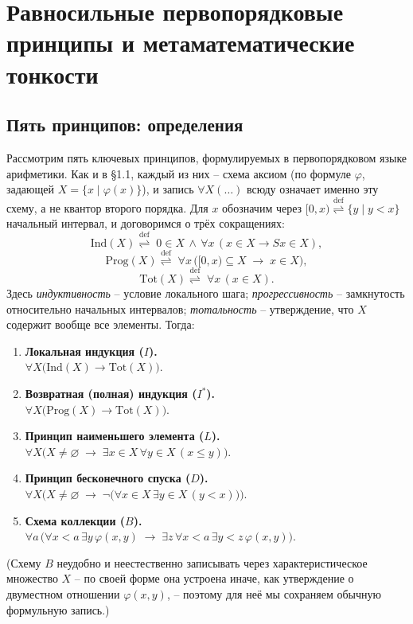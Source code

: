 \documentclass[12pt,a4paper]{article}
\theoremstyle{plain}
\theoremstyle{definition}
\newcommand{\ph}{\varphi}
\newcommand{\toinf}{\rightarrow}
\newcommand{\eqdef}{\mathrel{\overset{\mathrm{def}}{\rightleftharpoons}}}
\begin{document}
\section{Равносильные первопорядковые принципы и метаматематические тонкости}

\subsection{Пять принципов: определения}
Рассмотрим пять ключевых принципов, формулируемых в первопорядковом языке арифметики. Как и в §1.1, каждый из них -- схема аксиом (по формуле $\ph$, задающей $X=\{x \mid \ph(x)\}$), и запись $\forall X(\ldots)$ всюду означает именно эту схему, а не квантор второго порядка. Для $x$ обозначим через $[0,x)\eqdef\{y \mid y<x\}$ начальный интервал, и договоримся о трёх сокращениях:
$$\mathrm{Ind}(X) \eqdef\; 0\in X \,\land\, \forall x\,(x\in X\toinf Sx\in X),$$
$$\mathrm{Prog}(X) \eqdef\; \forall x\,\big([0,x)\subseteq X\;\toinf\; x\in X\big),$$
$$\mathrm{Tot}(X) \eqdef\; \forall x\,(x\in X).$$
Здесь \emph{индуктивность} -- условие локального шага; \emph{прогрессивность} -- замкнутость относительно начальных интервалов; \emph{тотальность} -- утверждение, что $X$ содержит вообще все элементы. Тогда:
\begin{enumerate}[leftmargin=1.2em, itemindent=0pt, labelsep=0.4em, itemsep=0.7em]
    \item \textbf{Локальная индукция ($I$).} \\ $\forall X\big(\mathrm{Ind}(X)\toinf \mathrm{Tot}(X)\big)$.
    \item \textbf{Возвратная (полная) индукция ($I^*$).} \\ $\forall X\big(\mathrm{Prog}(X)\toinf\mathrm{Tot}(X)\big)$.
    \item \textbf{Принцип наименьшего элемента ($L$).} \\ $\forall X\big(X\ne\varnothing \;\toinf\; \exists x\in X\,\forall y\in X\,(x\leqslant y)\big)$.
    \item \textbf{Принцип бесконечного спуска ($D$).} \\ $\forall X\big(X\ne\varnothing \;\toinf\; \neg\big(\forall x\in X\,\exists y\in X\,(y<x)\big)\big)$.
    \item \textbf{Схема коллекции ($B$).} \\ $\forall a\,\big(\forall x{<}a\,\exists y\,\ph(x,y) \;\toinf\; \exists z\,\forall x{<}a\,\exists y{<}z\,\ph(x,y)\big)$.
\end{enumerate}
(Схему $B$ неудобно и неестественно записывать через характеристическое множество $X$ -- по своей форме она устроена иначе, как утверждение о двуместном отношении $\ph(x,y)$, -- поэтому для неё мы сохраняем обычную формульную запись.)
\end{document}
